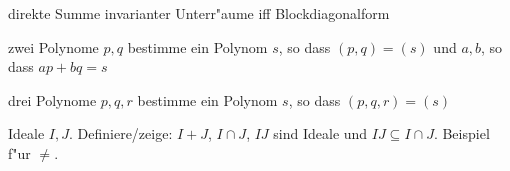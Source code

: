 \documentclass[a4,11pt]{article}
\begin{document}
\begin{aufgabe}
  direkte Summe invarianter Unterr"aume iff Blockdiagonalform
\end{aufgabe}

\begin{aufgabe}
  zwei Polynome $p,q$ bestimme ein Polynom $s$, so dass $(p,q) = (s)$
  und $a,b$, so dass $ap+bq=s$

  drei Polynome $p,q,r$ bestimme ein Polynom $s$, so dass $(p,q,r) = (s)$
\end{aufgabe}

\begin{aufgabe}
Ideale $I,J$. Definiere/zeige: $I+J$, $I \cap J$, $IJ$ sind Ideale und
$IJ \subseteq I \cap J$. Beispiel f"ur $\neq$.  
\end{aufgabe}
\end{document}
